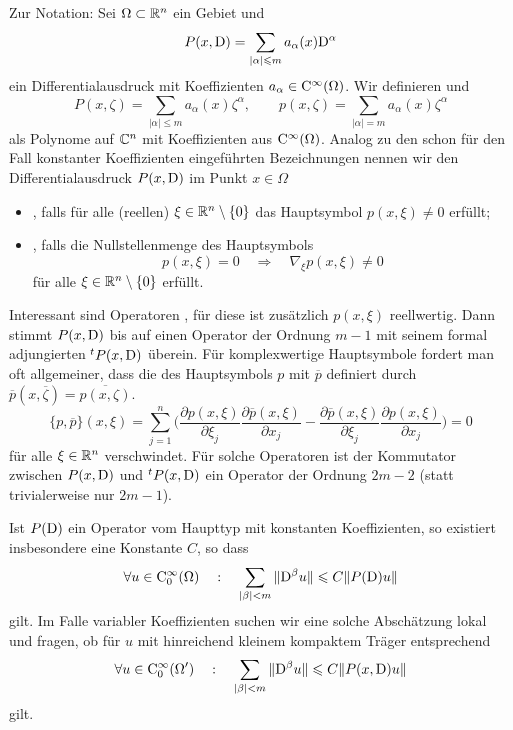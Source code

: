 Zur Notation: Sei $\Omega\subset\mathbb R^n$ ein Gebiet und 
\begin{equation}
   P(x,\mathrm D) = \sum_{|\alpha|\leqslant m} a_\alpha(x) \mathrm D^\alpha
\end{equation}
ein Differentialausdruck mit Koeffizienten $a_\alpha\in\mathrm C^\infty(\Omega)$. Wir definieren  und 
\begin{equation}
   P(x,\zeta) = \sum_{|\alpha|\le m} a_\alpha(x)\zeta^\alpha,\qquad p(x,\zeta)=\sum_{|\alpha|=m} a_\alpha(x)\zeta^\alpha
\end{equation}
als Polynome auf $\mathbb C^n$ mit Koeffizienten aus $\mathrm C^\infty(\Omega)$. Analog zu den schon für den Fall konstanter Koeffizienten eingeführten Bezeichnungen nennen wir den Differentialausdruck $P(x,\mathrm D)$ im Punkt $x\in\Omega$
\begin{itemize}
\item {}, falls für alle (reellen) $\xi\in\mathbb R^n\setminus\{0\}$ das Hauptsymbol $p(x,\xi)\ne0$ erfüllt;
\item {}, falls die Nullstellenmenge des Hauptsymbols 
\begin{equation}
    p(x,\xi) = 0 \quad \Longrightarrow \quad \nabla_\xi p(x,\xi)\ne0
\end{equation}
für alle $\xi\in\mathbb R^n\setminus\{0\}$ erfüllt.
\end{itemize}
Interessant sind Operatoren , für diese ist zusätzlich $p(x,\xi)$ reellwertig. Dann stimmt $P(x,\mathrm D)$ bis auf einen Operator der Ordnung $m-1$ mit seinem formal adjungierten ${}^t{P}(x,\mathrm D)$ \"uberein. Für komplexwertige Hauptsymbole fordert man oft allgemeiner, dass
die  des Hauptsymbols $p$ mit $\overline p$ definiert durch $\overline p(x, \overline\zeta) = \overline{p(x,\zeta)}$.
\begin{equation}
    \{ p,\overline p\} (x,\xi) = \sum_{j=1}^n \bigg(\frac{\partial p(x,\xi)}{\partial \xi_j} \frac{\partial \overline p (x,\xi)}{\partial x_j} - \frac{\partial \overline p(x,\xi)}{\partial \xi_j}\frac{\partial  p(x,\xi)}{\partial x_j} \bigg)    = 0 
\end{equation}
für alle $\xi\in\mathbb R^n$ verschwindet. Für solche Operatoren ist der Kommutator zwischen $P(x,\mathrm D)$ und ${}^t P(x,\mathrm D)$ ein Operator der Ordnung $2m-2$ (statt trivialerweise nur $2m-1$).

Ist $P(\mathrm D)$ ein Operator vom Haupttyp mit konstanten Koeffizienten, so existiert insbesondere eine Konstante $C$, so dass
\begin{equation}
  \forall u\in\mathrm C_0^\infty(\Omega)\quad:\quad  \sum_{|\beta|<m} \| \mathrm D^\beta u\| \leqslant C \| P(\mathrm D) u \|
\end{equation}
gilt. Im Falle variabler Koeffizienten suchen wir eine solche Abschätzung lokal und fragen, ob für $u$ mit hinreichend kleinem kompaktem Träger entsprechend
\begin{equation}
\forall u\in\mathrm C_0^\infty(\Omega')\quad:\quad      \sum_{|\beta|<m} \| \mathrm D^\beta u\| \leqslant C \| P(x,\mathrm D) u \|
\end{equation}
gilt.

